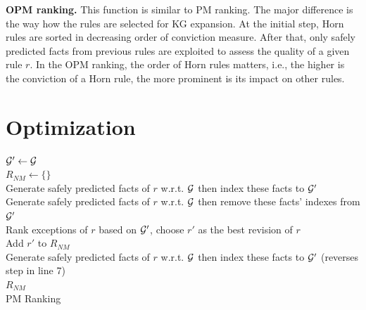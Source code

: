 \textbf{OPM ranking.} This function is similar to PM ranking. The major difference is the way how the rules are selected for KG expansion. At the initial step, Horn rules are sorted in decreasing order of conviction measure. After that, only safely predicted facts from previous rules are exploited to assess the quality of a given rule $r$. In the OPM ranking, the order of Horn rules matters, i.e., the higher is the conviction of a Horn rule, the more prominent is its impact on other rules.


\section{Optimization}

\IncMargin{1.5em}
\begin{algorithm}[h]
\DontPrintSemicolon
\SetAlgoLined
{}
\BlankLine
$\mathcal{G}' \leftarrow \mathcal{G}$\\
$R_{NM} \leftarrow \{\}$\\
\BlankLine
{} {
	Generate safely predicted facts of $r$ w.r.t. $\mathcal{G}$ then index these facts to $\mathcal{G}'$\\
}
\BlankLine
{} {
	Generate safely predicted facts of $r$ w.r.t. $\mathcal{G}$ then remove these facts' indexes from $\mathcal{G}'$\\
	Rank exceptions of $r$ based on $\mathcal{G}'$, choose $r'$ as the best revision of $r$\\
	Add $r'$ to $R_{NM}$\\
	Generate safely predicted facts of $r$ w.r.t. $\mathcal{G}$ then index these facts to $\mathcal{G}'$ (reverses step in line 7)\\
}
\Return $R_{NM}$\\
\caption{PM Ranking}
\label{pm_ranking_algo}
\end{algorithm}
\DecMargin{1.5em}

